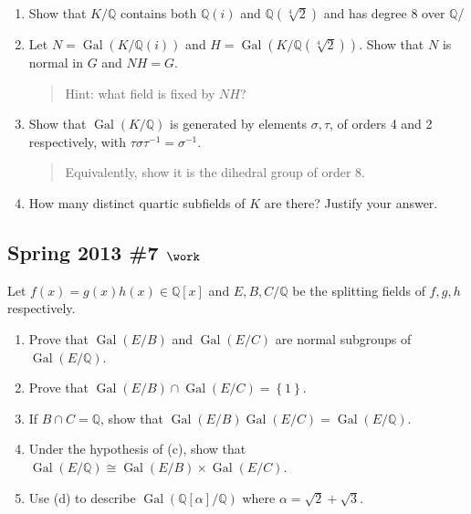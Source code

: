 \begin{enumerate}
\def\labelenumi{\alph{enumi}.}
\item
  Show that \(K/{\mathbb{Q}}\) contains both \({\mathbb{Q}}(i)\) and
  \({\mathbb{Q}}(\sqrt[4]{2})\) and has degree 8 over \({\mathbb{Q}}\)/
\item
  Let \(N = { \operatorname{Gal}} (K/{\mathbb{Q}}(i))\) and
  \(H = { \operatorname{Gal}} (K/{\mathbb{Q}}(\sqrt[4]{2}))\). Show that
  \(N\) is normal in \(G\) and \(NH = G\).

  \begin{quote}
  Hint: what field is fixed by \(NH\)?
  \end{quote}
\item
  Show that \({ \operatorname{Gal}} (K/{\mathbb{Q}})\) is generated by
  elements \(\sigma, \tau\), of orders 4 and 2 respectively, with
  \(\tau \sigma\tau^{-1}= \sigma^{-1}\).

  \begin{quote}
  Equivalently, show it is the dihedral group of order 8.
  \end{quote}
\item
  How many distinct quartic subfields of \(K\) are there? Justify your
  answer.
\end{enumerate}

\hypertarget{spring-2013-7-work}{%
\subsection{\texorpdfstring{Spring 2013 \#7
\(\work\)}{Spring 2013 \#7 \textbackslash work}}\label{spring-2013-7-work}}

Let \(f(x) = g(x) h(x) \in {\mathbb{Q}}[x]\) and \(E,B,C/{\mathbb{Q}}\)
be the splitting fields of \(f,g,h\) respectively.

\begin{enumerate}
\def\labelenumi{\alph{enumi}.}
\item
  Prove that \({ \operatorname{Gal}} (E/B)\) and
  \({ \operatorname{Gal}} (E/C)\) are normal subgroups of
  \({ \operatorname{Gal}} (E/{\mathbb{Q}})\).
\item
  Prove that
  \({ \operatorname{Gal}} (E/B) \cap{ \operatorname{Gal}} (E/C) = \left\{{1}\right\}\).
\item
  If \(B\cap C = {\mathbb{Q}}\), show that
  \({ \operatorname{Gal}} (E/B) { \operatorname{Gal}} (E/C) = { \operatorname{Gal}} (E/{\mathbb{Q}})\).
\item
  Under the hypothesis of (c), show that
  \({ \operatorname{Gal}} (E/{\mathbb{Q}}) \cong { \operatorname{Gal}} (E/B) \times { \operatorname{Gal}} (E/C)\).
\item
  Use (d) to describe
  \({ \operatorname{Gal}} ({\mathbb{Q}}[\alpha]/{\mathbb{Q}})\) where
  \(\alpha = \sqrt 2 + \sqrt 3\).
\end{enumerate}

